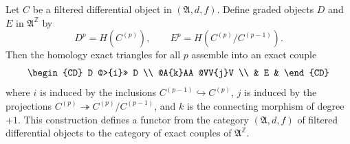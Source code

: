 Let $C$ be a filtered differential object in $(\mathfrak{A}, d, f)$. Define graded objects $D$ and $E$ in $\mathfrak{A}^{\mathbb{Z}}$ by
$$
D^p = H(C^{(p)}), \qquad E^p = H(C^{(p)}/C^{(p-1)}).
$$
Then the homology exact triangles for all $p$ assemble into an exact couple
$$
\begin{CD}
D @>{i}>> D \\
@A{k}AA @VV{j}V \\
& E &
\end{CD}
$$
where $i$ is induced by the inclusions $C^{(p-1)} \hookrightarrow C^{(p)}$, $j$ is induced by the projections $C^{(p)} \twoheadrightarrow C^{(p)}/C^{(p-1)}$, and $k$ is the connecting morphism of degree $+1$. This construction defines a functor from the category $(\mathfrak{A}, d, f)$ of filtered differential objects to the category of exact couples of $\mathfrak{A}^{\mathbb{Z}}$.
